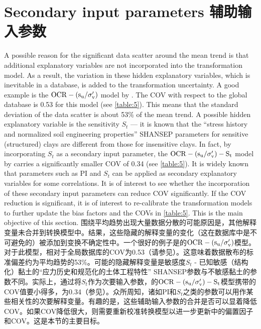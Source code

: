 \section{Secondary input parameters 辅助输入参数}

\begin{Parallel}{0.60\textwidth}{}
    \ParallelLText
    {
        A possible reason for the significant data scatter around the mean trend is that additional explanatory variables are not incorporated into the transformation model. As a result, the variation in these hidden explanatory variables, which is inevitable in a database, is added to the transformation uncertainty. A good example is the $\rm{OCR}-(s_u/\sigma_v')$ model by \citet{Jamiolkowski198557}. The COV with respect to the global database is 0.53 for this model (see \autoref{table:5}). This means that the standard deviation of the data scatter is about 53$\%$ of the mean trend. A possible hidden explanatory variable is the sensitivity $S_t$ — it is known that the “stress history and normalized soil engineering properties” SHANSEP parameters for sensitive (structured) clays are different from those for insensitive clays. In fact, by incorporating $S_t$ as a secondary input parameter, the $\rm{OCR}-(s_u/\sigma_v')-S_t$ model by \cite{Ching2012522}carries a significantly smaller COV of 0.34 (see \autoref{table:5}). It is widely known that parameters such as PI and $S_t$ can be applied as secondary explanatory variables for some correlations. It is of interest to see whether the incorporation of these secondary input parameters can reduce COV significantly. If the COV reduction is significant, it is of interest to re-calibrate the transformation models to further update the bias factors and the COVs in \autoref{table:5}. This is the main objective of this section.
    }
    \ParallelRText
    {
        围绕平均趋势出现大量数据分散的可能原因是，其他解释变量未合并到转换模型中。结果，这些隐藏的解释变量的变化（这在数据库中是不可避免的）被添加到变换不确定性中。一个很好的例子是\citet{Jamiolkowski198557}的$\rm{OCR}-(s_u/\sigma_v')$模型。对于此模型，相对于全局数据库的COV为0.53（请参见）。这意味着数据散布的标准偏差约为平均趋势的53$\%$。可能的隐藏解释变量是敏感度$S_t$ - 已知敏感（结构化）黏土的“应力历史和规范化的土体工程特性” SHANSEP参数与不敏感黏土的参数不同。实际上，通过将$S_t$作为次要输入参数，\cite{Ching2012522}的$\rm{OCR}-(s_u/\sigma_v')-S_t$模型携带的COV值要小得多，为0.34（参见）。众所周知，诸如PI和$S_t$之类的参数可以用作某些相关性的次要解释变量。有趣的是，这些辅助输入参数的合并是否可以显着降低COV。如果COV降低很大，则需要重新校准转换模型以进一步更新中的偏置因子和COV。这是本节的主要目标。
    }
\end{Parallel}


